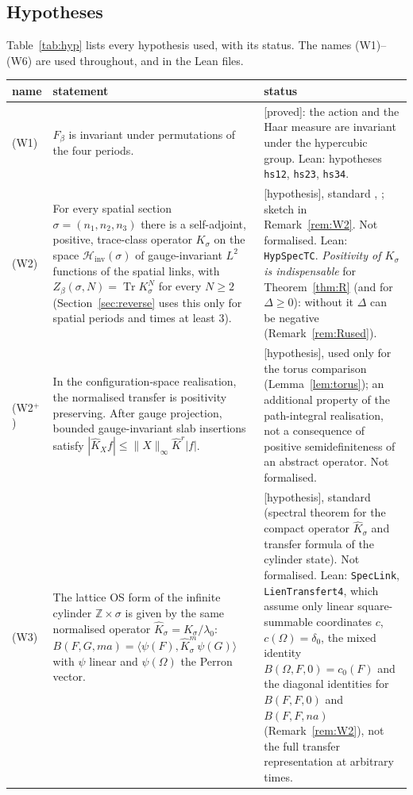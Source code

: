 \documentclass[11pt,a4paper]{article}
\theoremstyle{plain}
\theoremstyle{definition}
\theoremstyle{remark}
\numberwithin{equation}{section}
\newcommand{\Z}{\mathbb{Z}}
\newcommand{\Tr}{\operatorname{Tr}}
\newcommand{\Hinv}{\mathcal{H}_{\mathrm{inv}}}
\newcommand{\Kh}{\widehat K}
\newcommand{\st}[1]{\textsf{[#1]}}
\begin{document}
\subsection{Hypotheses}\label{sec:hyp}
Table~\ref{tab:hyp} lists every hypothesis used, with its status. The names (W1)--(W6) are used throughout, and in the Lean files.

\begin{table}[ht]
\centering\footnotesize
\begin{tabular}{@{}>{\raggedright\arraybackslash}p{}>{\raggedright\arraybackslash}p{}%
>{\raggedright\arraybackslash}p{}@{}}
\toprule
name & statement & status \\
\midrule
(W1) & $F_\beta$ is invariant under permutations of the four periods. & \st{proved}: the action and the Haar measure are invariant
under the hypercubic group. Lean: hypotheses \texttt{hs12}, \texttt{hs23}, \texttt{hs34}.\\
(W2) & For every spatial section $\sigma=(n_1,n_2,n_3)$ there is a self-adjoint, positive, trace-class operator $K_\sigma$ on the space
$\Hinv(\sigma)$ of gauge-invariant $L^2$ functions of the spatial links, with $Z_\beta(\sigma,N)=\Tr K_\sigma^N$ for every $N\ge2$ (Section~\ref{sec:reverse} uses this only for spatial periods and times at least $3$). &
\st{hypothesis}, standard \cite{Lus77}, \cite[\S2.3, Thm.~2.1]{OS78}; sketch in Remark~\ref{rem:W2}. Not formalised. Lean:
\texttt{HypSpecTC}. \emph{Positivity of $K_\sigma$ is indispensable} for Theorem~\ref{thm:R} (and for $\Delta\ge0$): without it $\Delta$ can be negative (Remark~\ref{rem:Rused}).\\
(W2$^+$) & In the configuration-space realisation, the normalised transfer is positivity preserving. After gauge projection, bounded
gauge-invariant slab insertions satisfy $|\Kh_Xf|\le\|X\|_\infty\Kh^r|f|$. & \st{hypothesis}, used only for the torus comparison
(Lemma~\ref{lem:torus}); an additional property of the path-integral realisation, not a consequence of positive semidefiniteness of an abstract
operator. Not formalised.\\
(W3) & The lattice OS form of the infinite cylinder $\Z\times\sigma$ is given by the same normalised operator $\Kh_\sigma=K_\sigma/\lambda_0$:
$B(F,G,ma)=\langle\psi(F),\Kh_\sigma^m\psi(G)\rangle$ with $\psi$ linear and $\psi(\Omega)$ the Perron vector. & \st{hypothesis},
standard (spectral theorem for the compact operator $\Kh_\sigma$ and transfer formula of the cylinder state). Not formalised. Lean:
\texttt{SpecLink}, \texttt{LienTransfert4}, which assume only linear square-summable coordinates $c$, $c(\Omega)=\delta_0$, the mixed identity $B(\Omega,F,0)=c_0(F)$ and the diagonal identities for $B(F,F,0)$ and $B(F,F,na)$ (Remark~\ref{rem:W2}), not the full transfer representation at arbitrary times.\\

\end{tabular}
\end{table}
\end{document}
